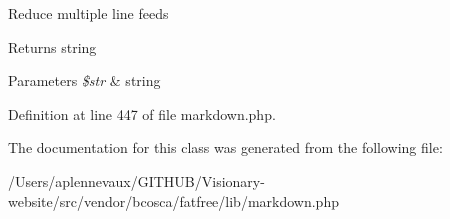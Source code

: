 Reduce multiple line feeds \begin{DoxyReturn}{Returns}
string 
\end{DoxyReturn}

\begin{DoxyParams}{Parameters}
{\em \$str} & string \\
\hline
\end{DoxyParams}


Definition at line 447 of file markdown.\+php.



The documentation for this class was generated from the following file\+:\begin{DoxyCompactItemize}
\item 
/\+Users/aplennevaux/\+G\+I\+T\+H\+U\+B/\+Visionary-\/website/src/vendor/bcosca/fatfree/lib/markdown.\+php\end{DoxyCompactItemize}
